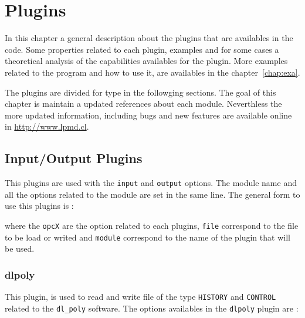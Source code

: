 \chapter{Plugins}
\label{chap:modulos}

In this chapter a general description about the plugins that are availables in
the {\lpmd} code. Some properties related to each plugin, examples and for some
cases a theoretical analysis of the capabilities availables for the plugin.
More examples related to the program {\lpmd} and how to use it, are availables
in the chapter~\ref{chap:exa}.

The plugins are divided for type in the followging sections. The goal of this
chapter is maintain a updated references about each module. Neverthless the
more updated information, including bugs and new features are available online
in \url{http://www.lpmd.cl}.

\section{Input/Output Plugins}
\label{chap:modulos:entradasalida}

This plugins are used with the \verb|input| and \verb|output| options. The
module name and all the options related to the module are set in the same line.
The general form to use this plugins is :


\noindent
where the \verb|opcX| are the option related to each plugins, \verb|file|
correspond to the file to be load or writed and \verb|module| correspond to the
name of the plugin that will be used.

\subsection{dlpoly}

This plugin, is used to read and write file of the type \verb|HISTORY| and
\verb|CONTROL| related to the \verb|dl_poly| software. The options availables
in the \verb|dlpoly| plugin are :



